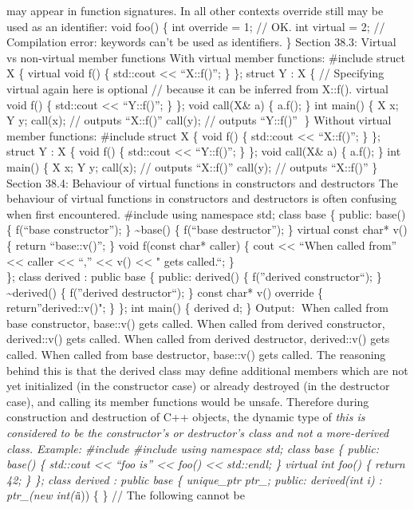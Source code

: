 may appear in function signatures. In all other contexts override still
may be used as an identiﬁer: void foo() \{ int override = 1; // OK. int
virtual = 2; // Compilation error: keywords can't be used as
identifiers. \} Section 38.3: Virtual vs non-virtual member functions
With virtual member functions: \#include struct X \{ virtual void f() \{
std::cout \textless\textless{} ``X::f()\n''; \} \}; struct Y : X \{ //
Specifying virtual again here is optional // because it can be inferred
from X::f(). virtual void f() \{ std::cout \textless\textless{}
``Y::f()\n''; \} \}; void call(X\& a) \{ a.f(); \} int main() \{ X x; Y
y; call(x); // outputs ``X::f()'' call(y); // outputs ``Y::f()'' \}
Without virtual member functions: \#include struct X \{ void f() \{
std::cout \textless\textless{} ``X::f()\n''; \} \}; struct Y : X \{ void
f() \{ std::cout \textless\textless{} ``Y::f()\n''; \} \}; void call(X\&
a) \{ a.f(); \} int main() \{ X x; Y y; call(x); // outputs ``X::f()''
call(y); // outputs ``X::f()'' \} Section 38.4: Behaviour of virtual
functions in constructors and destructors The behaviour of virtual
functions in constructors and destructors is often confusing when ﬁrst
encountered. \#include using namespace std; class base \{ public: base()
\{ f(``base constructor''); \} \textasciitilde base() \{ f(``base
destructor''); \} virtual const char* v() \{ return ``base::v()''; \}
void f(const char* caller) \{ cout \textless\textless{} ``When called
from'' \textless\textless{} caller \textless\textless{} ``,''
\textless\textless{} v() \textless\textless{} " gets called.\n``; \}\\
\}; class derived : public base \{ public: derived() \{ f(''derived
constructor``); \} \textasciitilde derived() \{ f(''derived
destructor``); \} const char* v() override \{ return''derived::v()"; \}
\}; int main() \{ derived d; \} Output: When called from base
constructor, base::v() gets called. When called from derived
constructor, derived::v() gets called. When called from derived
destructor, derived::v() gets called. When called from base destructor,
base::v() gets called. The reasoning behind this is that the derived
class may deﬁne additional members which are not yet initialized (in the
constructor case) or already destroyed (in the destructor case), and
calling its member functions would be unsafe. Therefore during
construction and destruction of C++ objects, the dynamic type of
\emph{this is considered to be the constructor's or destructor's class
and not a more-derived class. Example: \#include \#include using
namespace std; class base \{ public: base() \{ std::cout
\textless\textless{} ``foo is'' \textless\textless{} foo()
\textless\textless{} std::endl; \} virtual int foo() \{ return 42; \}
\}; class derived : public base \{ unique\_ptr ptr\_; public:
derived(int i) : ptr\_(new int(i}i)) \{ \} // The following cannot be
